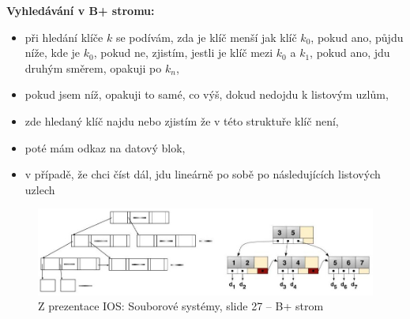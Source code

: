 \documentclass[a4paper, 11pt]{article}
\begin{document}
\textbf{Vyhledávání v B+ stromu:}
\begin{itemize}
    \item při hledání klíče $k$ se podívám, zda je klíč menší jak klíč $k_0$, pokud ano, půjdu níže, kde je $k_0$, pokud ne, zjistím, jestli je klíč mezi $k_0$ a $k_1$, pokud ano, jdu druhým směrem, opakuji po $k_n$,
    \item pokud jsem níž, opakuji to samé, co výš, dokud nedojdu k listovým uzlům,
    \item zde hledaný klíč najdu nebo zjistím že v této struktuře klíč není,
    \item poté mám odkaz na datový blok,
    \item v případě, že chci číst dál, jdu lineárně po sobě po následujících listových uzlech
\end{itemize}

\begin{figure}[htb]
    \centering
    \includegraphics[width=\textwidth]{6.3.4.jpg}
    \caption{Z prezentace IOS: Souborové systémy, slide 27 -- B+ strom}
\end{figure}

\newpage
\end{document}
